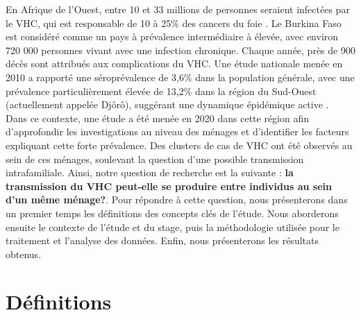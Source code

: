 \documentclass[a4paper,12pt]{article}
\begin{document}
 
En Afrique de l’Ouest, entre 10 et 33 millions de personnes seraient infectées par le VHC, qui est responsable de 10 à 25\% des cancers du foie \cite{linganiChangingEpidemiologyHepatitis2020}. Le Burkina Faso est considéré comme un pays à prévalence intermédiaire à élevée, avec environ 720 000 personnes vivant avec une infection chronique. Chaque année, près de 900 décès sont attribués aux complications du VHC. Une étude nationale menée en 2010 a rapporté une séroprévalence de 3,6\% dans la population générale, avec une prévalence particulièrement élevée de 13,2\% dans la région du Sud-Ouest (actuellement appelée Djôrô), suggérant une dynamique épidémique active \cite{medaHepatitisVirusSeroprevalence2018}. \\
 
 
 Dans ce contexte, une étude a été menée en 2020 dans cette région afin d’approfondir les investigations au niveau des ménages et d’identifier les facteurs expliquant cette forte prévalence. Des clusters de cas de VHC ont été observés au sein de ces ménages, soulevant la question d’une possible transmission intrafamiliale. Ainsi, notre question de recherche est la suivante : \textbf{la transmission du VHC peut-elle se produire entre individus au sein d’un même ménage?}. Pour répondre à cette question, nous présenterons dans un premier temps les définitions des concepts clés de l’étude. Nous aborderons ensuite le contexte de l’étude et du stage, puis la méthodologie utilisée pour le traitement et l’analyse des données. Enfin, nous présenterons les résultats obtenus.
 
 

 \newpage 
 
 \section{Définitions}
  
\end{document}
